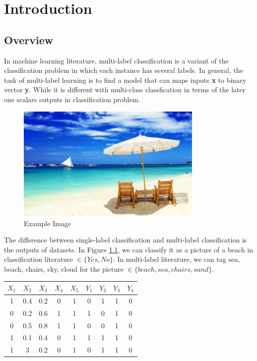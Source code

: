 
\chapter{Introduction} %
\label{Chapter5}


\section{Overview}

In machine learning literature, multi-label classification is a variant of the classification problem in which each instance has several labels. In general, the task of multi-label learning is to find a model that can maps inputs \textbf{x} to binary vector \textbf{y}. While it is different with multi-class classfication in terms of the later one scalars outputs in classification problem.

\graphicspath{ {./Figures/} }
\begin{figure}[!htb]
    \centering
	\includegraphics[width=0.8\textwidth]{beach.jpg}
    \caption{Example Image}%
    \label{fig:MultilableImage}%
\end{figure}

The difference between single-label classification and multi-label classification is the outputs of datasets.
In Figure \ref{fig:MultilableImage}, we can classify it as a picture of a beach in classification literature $\in \{Yes, No\}$. In multi-label literature, we can tag sea, beach, chairs, sky, cloud for the picture $\in \{beach, sea, chairs, sand\}$.

\begin{center}
\begin{tabular}{c c c c c | c c c c}
$X_{1}$ & $X_{2}$ &  $X_{3}$ & $X_{4}$ & $X_{5}$ & $Y_{1}$ & $Y_{2}$ & $Y_{3}$ & $Y_{4}$ & \\
\hline
1 & 0.4 & 0.2 & 0 & 1 & 0 & 1 & 1 & 0 \\
0 & 0.2 & 0.6 & 1 & 1 & 1 & 0 & 1 & 0 \\
0 & 0.5 & 0.8 & 1 & 1 & 0 & 0 & 1 & 0 \\
1 & 0.1 & 0.4 & 0 & 1 & 1 & 1 & 1 & 0 \\
1 & 3 & 0.2 & 0 & 1 & 0 & 1 & 1 & 0 \\
\end{tabular}
\end{center}

